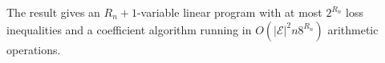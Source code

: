 The result gives an \(R_n+1\)-variable linear program with at most \(2^{R_n}\) loss inequalities and a coefficient algorithm running in \(O(|\mathcal E|^2n8^{R_n})\) arithmetic operations.